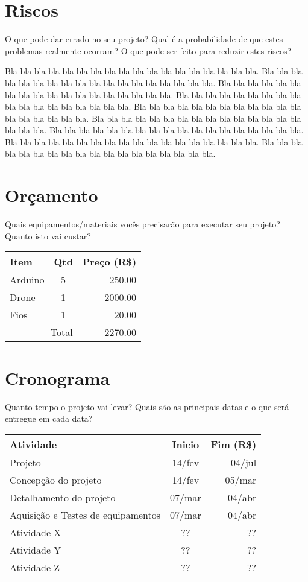 \documentclass{acm_proc_article-sp}
\begin{document}
\section{Riscos}

O que pode dar errado no seu projeto?
Qual é a probabilidade de que estes problemas realmente ocorram?
O que pode ser feito para reduzir estes riscos?

Bla bla bla bla bla bla bla bla bla bla bla bla bla bla bla bla bla bla.
Bla bla bla bla bla bla bla bla bla bla bla bla bla bla bla bla bla bla.
Bla bla bla bla bla bla bla bla bla bla bla bla bla bla bla bla bla bla.
Bla bla bla bla bla bla bla bla bla bla bla bla bla bla bla bla bla bla.
Bla bla bla bla bla bla bla bla bla bla bla bla bla bla bla bla bla bla.
Bla bla bla bla bla bla bla bla bla bla bla bla bla bla bla bla bla bla.
Bla bla bla bla bla bla bla bla bla bla bla bla bla bla bla bla bla bla.
Bla bla bla bla bla bla bla bla bla bla bla bla bla bla bla bla bla bla.
Bla bla bla bla bla bla bla bla bla bla bla bla bla bla bla bla bla bla.

\section{Orçamento}

Quais equipamentos/materiais vocês precisarão para executar seu projeto?
Quanto isto vai custar?

\begin{table}[h!]
\centering
\begin{tabular}{l|c|r}
Item & Qtd & Preço (R\$) \\
\hline
Arduino & 5 & 250.00 \\
Drone   & 1 & 2000.00 \\
Fios    & 1 & 20.00 \\
\hline
\multicolumn{2}{r}{Total} & 2270.00
\end{tabular}
\end{table}


\section{Cronograma}

Quanto tempo o projeto vai levar?
Quais são as principais datas e o que será entregue em cada data?

\begin{table}[h!]
\centering
\begin{tabular}{l|c|r}
Atividade & Inicio & Fim (R\$) \\
\hline
Projeto & 14/fev & 04/jul \\
\hline
Concepção do projeto & 14/fev & 05/mar \\
Detalhamento do projeto & 07/mar & 04/abr \\
Aquisição e Testes de equipamentos & 07/mar & 04/abr \\
Atividade X & ?? & ?? \\
Atividade Y & ?? & ?? \\
Atividade Z & ?? & ?? \\
\end{tabular}
\label{tab:my_label}
\end{table}
\end{document}
